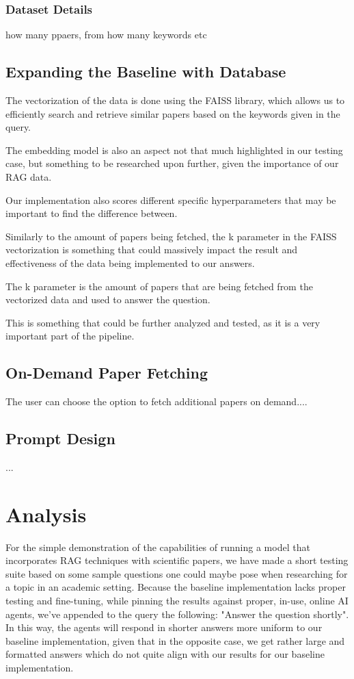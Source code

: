 \documentclass[fleqn,moreauthors,10pt]{ds_report}
\begin{document}
\subsubsection*{Dataset Details}
how many ppaers, from how many keywords etc

\subsection*{Expanding the Baseline with Database}

The vectorization of the data is done using the FAISS library, which allows us to efficiently search and retrieve similar papers based on the keywords given in the query.

The embedding model is also an aspect not that much highlighted in our testing case, but something to be researched upon further, given the importance of our RAG data.

Our implementation also scores different specific hyperparameters that may be important to find the difference between.

Similarly to the amount of papers being fetched, the k parameter in the FAISS vectorization is something that could massively impact the result and effectiveness of the data being implemented to our answers.

The k parameter is the amount of papers that are being fetched from the vectorized data and used to answer the question.

This is something that could be further analyzed and tested, as it is a very important part of the pipeline.

\subsection*{On-Demand Paper Fetching}

The user can choose the option to fetch additional papers on demand....

\subsection*{Prompt Design}

...


\section*{Analysis}
For the simple demonstration of the capabilities of running a model that incorporates RAG techniques with scientific papers, we have made a short testing suite based on some sample questions one could maybe pose when researching for a topic in an academic setting. Because the baseline implementation lacks proper testing and fine-tuning, while pinning the results against proper, in-use, online AI agents, we've appended to the query the following: "Answer the question shortly". In this way, the agents will respond in shorter answers more uniform to our baseline implementation, given that in the opposite case, we get rather large and formatted answers which do not quite align with our results for our baseline implementation.
\end{document}
